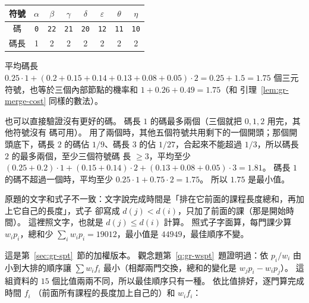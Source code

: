 \begin{center}
\begin{tabular}{c*{7}{c}}
\toprule
符號 & $\alpha$ & $\beta$ & $\gamma$ & $\delta$ & $\varepsilon$ & $\theta$ & $\eta$ \\
\midrule
碼 & \texttt{0} & \texttt{22} & \texttt{21} & \texttt{20} & \texttt{12} & \texttt{11} & \texttt{10} \\
碼長 & 1 & 2 & 2 & 2 & 2 & 2 & 2 \\
\bottomrule
\end{tabular}
\end{center}

平均碼長 $0.25 \cdot 1 + (0.2 + 0.15 + 0.14 + 0.13 + 0.08 + 0.05) \cdot 2 = 0.25 + 1.5 =
1.75$ 個三元符號，也等於三個內部節點的機率和 $1 + 0.26 + 0.49 = 1.75$（和
引理~\ref{lem:gr-merge-cost} 同樣的數法）。

也可以直接驗證沒有更好的碼。 碼長 $1$ 的碼最多兩個（三個就把 $0, 1, 2$ 用完，其他符號沒有
碼可用）。 用了兩個時，其他五個符號共用剩下的一個開頭；那個開頭底下，碼長 $2$ 的碼佔
$1/9$、碼長 $3$ 的佔 $1/27$，合起來不能超過 $1/3$，所以碼長 $2$ 的最多兩個，至少三個符號碼
長 $\ge 3$，平均至少 $(0.25 + 0.2) \cdot 1 + (0.15 + 0.14) \cdot 2 + (0.13 + 0.08 + 0.05) \cdot 3 =
1.81$。 碼長 $1$ 的碼不超過一個時，平均至少 $0.25 \cdot 1 + 0.75 \cdot 2 = 1.75$。 所以
$1.75$ 是最小值。

原題的文字和式子不一致：文字說完成時間是「排在它前面的課程長度總和，再加上它自己的長度」，式子
卻寫成 $d(j) < d(i)$，只加了前面的課（那是開始時間）。 這裡照文字，也就是 $d(j) \le d(i)$ 計算。
照式子字面算，每門課少算 $w_i p_i$，總和少 $\sum_i w_i p_i = 19012$，最小值是 $44949$，最佳順序不變。

這是第~\ref{sec:gr-spt}~節的加權版本。 觀念題第~\ref{q:gr-wspt}~題證明過：依 $p_i / w_i$ 由
小到大排的順序讓 $\sum w_i f_i$ 最小（相鄰兩門交換，總和的變化是 $w_j p_i - w_i p_j$）。 這
組資料的 $15$ 個比值兩兩不同，所以最佳順序只有一種。 依比值排好，逐門算完成時間 $f_i$
（前面所有課程的長度加上自己的）和 $w_i f_i$：

